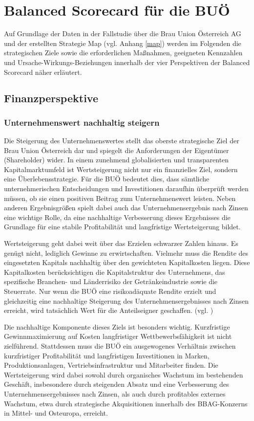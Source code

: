 \section{Balanced Scorecard für die BUÖ}

Auf Grundlage der Daten in der Fallstudie über die Brau Union Österreich AG und der erstellten Strategie Map (vgl. Anhang \ref{map}) werden im Folgenden die strategischen Ziele sowie die erforderlichen Maßnahmen, geeigneten Kennzahlen und Ursache-Wirkungs-Beziehungen innerhalb der vier Perspektiven der Balanced Scorecard näher erläutert.

\subsection{Finanzperspektive}  

\subsubsection{Unternehmenswert nachhaltig steigern}  

Die Steigerung des Unternehmenswertes stellt das oberste strategische Ziel der Brau Union Österreich dar und spiegelt die Anforderungen der Eigentümer (Shareholder) wider. In einem zunehmend globalisierten und transparenten Kapitalmarktumfeld ist Wertsteigerung nicht nur ein finanzielles Ziel, sondern eine Überlebensstrategie. Für die BUÖ bedeutet dies, dass sämtliche unternehmerischen Entscheidungen und Investitionen daraufhin überprüft werden müssen, ob sie einen positiven Beitrag zum Unternehmenswert leisten. Neben anderen Ergebnisgrößen spielt dabei auch das Unternehmensergebnis nach Zinsen eine wichtige Rolle, da eine nachhaltige Verbesserung dieses Ergebnisses die Grundlage für eine stabile Profitabilität und langfristige Wertsteigerung bildet. 

Wertsteigerung geht dabei weit über das Erzielen schwarzer Zahlen hinaus. Es genügt nicht, lediglich Gewinne zu erwirtschaften. Vielmehr muss die Rendite des eingesetzten Kapitals nachhaltig über den gewichteten Kapitalkosten liegen. Diese Kapitalkosten berücksichtigen die Kapitalstruktur des Unternehmens, das spezifische Branchen- und Länderrisiko der Getränkeindustrie sowie die Steuerrate. Nur wenn die BUÖ eine risikoadäquate Rendite erzielt und gleichzeitig eine nachhaltige Steigerung des Unternehmensergebnisses nach Zinsen erreicht, wird tatsächlich Wert für die Anteilseigner geschaffen. (vgl. \cite{Kapitalkosten}) 

Die nachhaltige Komponente dieses Ziels ist besonders wichtig. Kurzfristige Gewinnmaximierung auf Kosten langfristiger Wettbewerbsfähigkeit ist nicht zielführend. Stattdessen muss die BUÖ ein ausgewogenes Verhältnis zwischen kurzfristiger Profitabilität und langfristigen Investitionen in Marken, Produktionsanlagen, Vertriebsinfrastruktur und Mitarbeiter finden. Die Wertsteigerung wird dabei sowohl durch organisches Wachstum im bestehenden Geschäft, insbesondere durch steigenden Absatz und eine Verbesserung des Unternehmensergebnisses nach Zinsen, als auch durch profitables externes Wachstum, etwa durch strategische Akquisitionen innerhalb des BBAG-Konzerns in Mittel- und Osteuropa, erreicht. 

